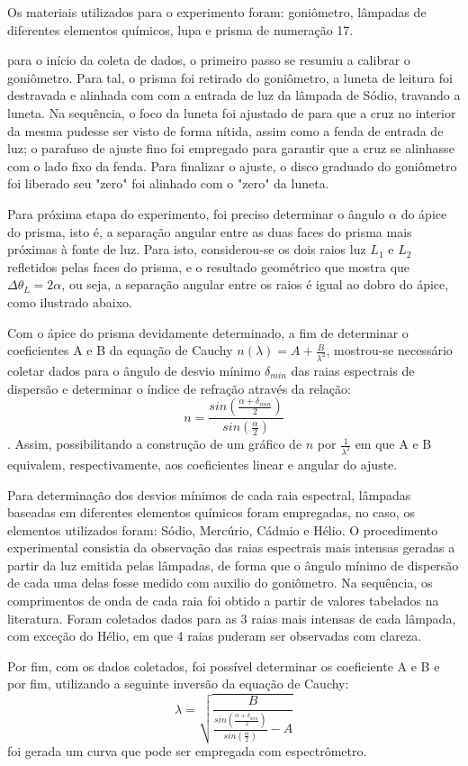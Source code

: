 Os materiais utilizados para o experimento foram: goniômetro, lâmpadas de diferentes elementos químicos, lupa e prisma de numeração 17.

para  o início da coleta de dados, o primeiro passo se resumiu a calibrar o goniômetro. Para tal, o prisma foi retirado do goniômetro, a luneta de leitura foi destravada e alinhada com com a entrada de luz da lâmpada de Sódio, travando a luneta. Na sequência, o foco da luneta foi ajustado de para que a cruz no interior da mesma pudesse ser visto de forma nítida, assim como a fenda de entrada de luz; o parafuso de ajuste fino foi empregado para garantir que a cruz se alinhasse com o lado fixo da fenda. Para finalizar o ajuste, o disco graduado do goniômetro foi liberado seu "zero" foi alinhado com o "zero" da luneta.

Para próxima etapa do experimento, foi preciso determinar o ângulo $\alpha$ do ápice do prisma, isto é, a separação angular entre as duas faces do prisma mais próximas à fonte de luz. Para isto, considerou-se os dois raios luz $L_1$ e $L_2$ refletidos pelas faces do prisma, e o resultado geométrico que mostra que $\Delta \theta_L = 2\alpha$, ou seja, a separação angular entre os raios é igual ao dobro do ápice, como ilustrado abaixo.



Com o ápice do prisma devidamente determinado, a fim de determinar o coeficientes A e B da equação de Cauchy $n(\lambda) = A + \frac{B}{\lambda^2}$, mostrou-se necessário coletar dados para o ângulo de desvio mínimo $\delta_{min}$ das raias espectrais de dispersão e determinar o índice de refração através da relação: $$n = \frac{sin(\frac{\alpha + \delta_{min}}{2})}{sin(\frac{\alpha}{2})}$$. Assim, possibilitando a construção de um gráfico de $n$ por $\frac{1}{\lambda^2}$ em que A e B equivalem, respectivamente, aos coeficientes linear e angular do ajuste.

Para determinação dos desvios mínimos de cada raia espectral, lâmpadas baseadas em diferentes elementos químicos foram empregadas, no caso, os elementos utilizados foram: Sódio, Mercúrio, Cádmio e Hélio. O procedimento experimental consistia da observação das raias espectrais mais intensas geradas a partir da luz emitida pelas lâmpadas, de forma que o ângulo mínimo de dispersão de cada uma delas fosse medido com auxilio do goniômetro. Na sequência, os comprimentos de onda de cada raia foi obtido a partir de valores tabelados na literatura. Foram coletados dados para as 3 raias mais intensas de cada lâmpada, com exceção do Hélio, em que 4 raias puderam ser observadas com clareza.

Por fim, com os dados coletados, foi possível determinar os coeficiente A e B e por fim, utilizando a seguinte inversão da equação de Cauchy: $$\lambda = \sqrt{\frac{B}{\frac{sin\left(\frac{\alpha + \delta_{min}}{2}\right)}{sin\left(\frac{\alpha}{2}\right)}-A}}$$ foi gerada um curva que pode ser empregada com espectrômetro.



